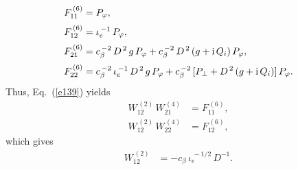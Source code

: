 \documentclass[12pt,prb,aps,notitlepage]{revtex4-1}
\begin{document}
\begin{align}
F^{\,(6)}_{11} &=P_\varphi,\\[0.5ex]
F^{\,(6)}_{12} &= \iota_e^{\,-1}\,P_\varphi,\\[0.5ex]
F^{\,(6)}_{21} &=c_\beta^{\,-2}\,D^{\,2}\,g\,P_\varphi + c_\beta^{\,-2}\,D^{\,2}\,(g+{\rm i}\,Q_i)\,P_\varphi,\\[0.5ex]
F^{\,(6)}_{22} &=c_\beta^{\,-2}\,\iota_e^{\,-1}\,D^{\,2}\,g\,P_\varphi + c_\beta^{\,-2}\,[P_\perp+D^{\,2}\,(g+{\rm i}\,Q_i)]\,P_\varphi.
\end{align}
Thus, Eq.~(\ref{e139}) yields
\begin{align}
W_{12}^{\,(2)}\,W_{21}^{\,(4)} &= F_{11}^{\,(6)},\\[0.5ex]
W_{12}^{\,(2)}\,W_{22}^{\,(4)} &= F_{12}^{\,(6)},
\end{align}
which gives 
\begin{align}
W_{12}^{\,(2)} &= - c_\beta\,\iota_e^{\,-1/2}\,D^{-1}.
\end{align}
\end{document}
